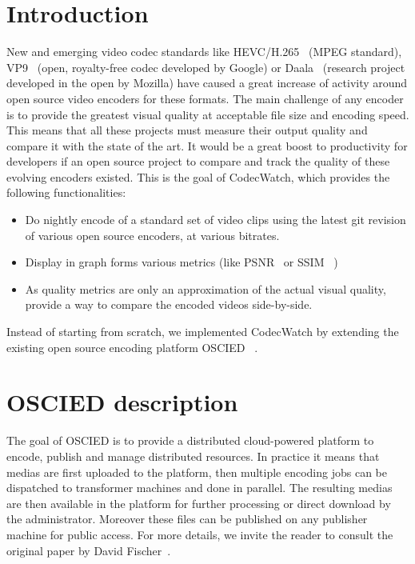 \documentclass[a4paper,12pt]{article}
\begin{document}
%

\tableofcontents

\newpage

\section{Introduction}
New and emerging video codec standards like
HEVC/H.265~ \cite{hevc} (MPEG standard),
VP9~ \cite{vp9} (open, royalty-free codec
developed by Google) or Daala~ \cite{daala} (research
project developed in the open by Mozilla) have caused a great increase of
activity around open source video encoders for these formats. The main challenge
of any encoder is to provide the greatest visual quality at acceptable file size
and encoding speed. This means that all these projects must measure their output
quality and compare it with the state of the art. It would be a great boost to
productivity for developers if an open source project to compare and track the
quality of these evolving encoders existed. This is the goal of CodecWatch,
which provides the following functionalities:
\begin{itemize}
\item Do nightly encode of a standard set of video clips using the latest git
revision of various open source encoders, at various bitrates.
\item Display in graph forms various metrics (like
    PSNR~ \cite{psnr} or
    SSIM~ \cite{ssim})
\item As quality metrics are only an approximation of the actual visual quality,
provide a way to compare the encoded videos side-by-side.
\end{itemize} Instead of starting from scratch, we implemented CodecWatch by
extending the existing open source encoding platform
OSCIED~ \cite{oscied}.

\section{OSCIED description}
The goal of OSCIED is to provide a distributed cloud-powered platform to encode,
publish and manage distributed resources.  In practice it means that medias are
first uploaded to the platform, then multiple encoding jobs can be dispatched to
transformer machines and done in parallel.  The resulting medias are then
available in the platform for further processing or direct download by the
administrator.  Moreover these files can be published on any publisher machine
for public access.
For more details, we invite the reader to consult the original paper by David
Fischer~\cite{df_thesis}.
\end{document}

